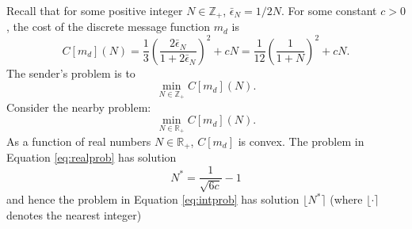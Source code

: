 \documentclass{article}
\begin{document}
Recall that for some positive integer $N\in\mathbb{Z}_{+}$, $\bar{\epsilon}_{N}=1/2N$. For some constant $c>0$, the cost of the discrete message function $m_{d}$ is
\begin{equation}
C[m_{d}](N)=\frac{1}{3}\left(\frac{2\bar{\epsilon}_{N}}{1+2\bar{\epsilon}_{N}}\right)^{2}+cN=\frac{1}{12}\left(\frac{1}{1+N}\right)^{2}+cN.
\end{equation}
The sender's problem is to
\begin{equation}\label{eq:intprob}
\min_{N\in\mathbb{Z}_{+}}C[m_{d}](N).
\end{equation}
Consider the nearby problem:
\begin{equation}\label{eq:realprob}
\min_{N\in\mathbb{R}_{+}}C[m_{d}](N).
\end{equation}
As a function of real numbers $N\in\mathbb{R}_{+}$, $C[m_{d}]$ is convex. The problem in Equation \ref{eq:realprob} has solution
\begin{equation}
N^{*}=\frac{1}{\sqrt{6c}}-1
\end{equation}
and hence the problem in Equation \ref{eq:intprob} has solution $\lfloor N^{*}\rceil$ (where $\lfloor\cdot\rceil$ denotes the nearest integer) 
\end{document}
